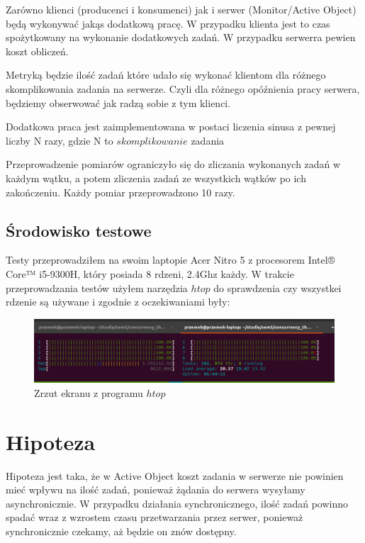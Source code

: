 \documentclass[12pt,a4paper,table]{article}
\begin{document}
    Zarówno klienci (producenci i konsumenci) jak i serwer (Monitor/Active Object)
    będą wykonywać jakąs dodatkową pracę. W przypadku klienta jest to czas spożytkowany
    na wykonanie dodatkowych zadań. W przypadku serwerra pewien koszt obliczeń.

    Metryką będzie ilość zadań które udało się wykonać klientom dla różnego skomplikowania
    zadania na serwerze. Czyli dla różnego opóźnienia pracy serwera, będziemy obserwować jak radzą sobie 
    z tym klienci.

    Dodatkowa praca jest zaimplementowana w postaci liczenia sinusa z pewnej liczby N razy, 
    gdzie N to $skomplikowanie$ zadania

    Przeprowadzenie pomiarów ograniczyło się do zliczania wykonanych zadań w każdym wątku,
    a potem zliczenia zadań ze wszystkich wątków po ich zakończeniu.
    Każdy pomiar przeprowadzono 10 razy.

    \subsection{Środowisko testowe}
    Testy przeprowadziłem na swoim laptopie Acer Nitro 5 
    z procesorem Intel® Core™ i5-9300H, który posiada 8 rdzeni, 2.4Ghz każdy.
    W trakcie przeprowadzania testów użyłem narzędzia $htop$ do sprawdzenia czy wszystkei rdzenie są używane
    i zgodnie z oczekiwaniami były: 

    \begin{figure}[H]
        \centering
        \includegraphics[width=1\linewidth]{img/htop.png}
        \caption{Zrzut ekranu z programu $htop$}
        \label{fig:htop}
    \end{figure}


    \section{Hipoteza}
    Hipoteza jest taka, że w Active Object koszt zadania w serwerze nie 
    powinien mieć wpływu na ilość zadań, ponieważ żądania do serwera wysyłamy asynchronicznie.
    W przypadku działania synchronicznego, ilość zadań powinno spadać wraz z wzrostem
    czasu przetwarzania przez serwer, ponieważ synchronicznie czekamy, aż będzie on znów 
    dostępny.
\end{document}
